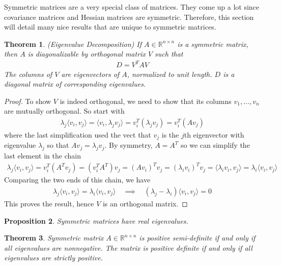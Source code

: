 \documentclass[12pt]{article}
\numberwithin{equation}{section} %
\theoremstyle{plain}
\newtheorem{thm}{Theorem}[section]
\newtheorem{prop}[thm]{Proposition}
\theoremstyle{definition}
\theoremstyle{remark}
\newcommand{\Rnn}{\mathbb{R}^{n\times n}}
\begin{document}
Symmetric matrices are a very special class of matrices. They come up a
lot since covariance matrices and Hessian matrices are symmetric.
Therefore, this section will detail many nice results that are unique to
symmetric matrices.

\begin{thm}\emph{(Eigenvalue Decomposition)}
\label{thm:symmetric-diag}
If $A\in\Rnn$ is a symmetric matrix, then $A$ is
diagonalizable by orthogonal matrix $V$ such that
\begin{align*}
  D = V^T A V
\end{align*}
The columns of $V$ are eigenvectors of $A$, normalized to unit length.
$D$ is a diagonal matrix of corresponding eigenvalues.
\end{thm}
\begin{proof}
To show $V$ is indeed orthogonal, we need to show that its columns
$v_1,\ldots,v_n$ are mutually orthogonal. So start with
\begin{align*}
  \lambda_j \langle v_i, v_j \rangle
  =
  \langle v_i, \lambda_j v_j \rangle
  = v_i^T (\lambda_j v_j)
  = v_i^T (A v_j)
\end{align*}
where the last simplification used the vect that $v_j$ is the $j$th
eigenvector with eigenvalue $\lambda_j$ so that $Av_j=\lambda_j v_j$.
By symmetry, $A=A^T$ so we can simplify the last element in the chain
\begin{align*}
  \lambda_j \langle v_i, v_j \rangle
  = v_i^T (A^T v_j)
  = (v_i^T A^T) v_j
  = (Av_i)^T v_j
  = (\lambda_i v_i)^T v_j
  = \langle \lambda_i v_i, v_j \rangle
  = \lambda_i \langle v_i, v_j \rangle
\end{align*}
Comparing the two ends of this chain, we have
\begin{align*}
  \lambda_j \langle v_i, v_j \rangle
  = \lambda_i \langle v_i, v_j \rangle
  \quad\implies\quad
  (\lambda_j-\lambda_i) \langle v_i, v_j \rangle
  = 0
\end{align*}
This proves the result, hence $V$ is an orthogonal matrix.
\end{proof}

\begin{prop}
Symmetric matrices have \emph{real} eigenvalues.
\end{prop}

\begin{thm}
\label{thm:possemidef-eigenval}
Symmetric matrix $A\in\Rnn$ is positive semi-definite if and only if all
eigenvalues are nonnegative. The matrix is positive definite if and only
if all eigenvalues are strictly positive.
\end{thm}
\end{document}
